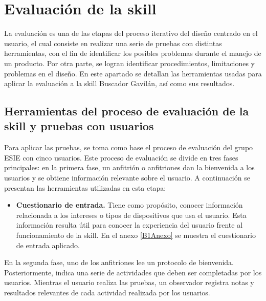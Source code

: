 
\section{Evaluación de la skill}
\label{EvaluacionSkillcapIV}

La evaluación es una de las etapas del proceso iterativo del diseño centrado en el usuario, el cual consiste en realizar una serie de pruebas con distintas herramientas, con el fin de identificar los posibles problemas durante el manejo de un producto. Por otra parte, se logran identificar procedimientos, limitaciones y problemas en el diseño. En este apartado se detallan las herramientas usadas para aplicar la evaluación a la skill Buscador Gavilán, así como sus resultados.


\subsection{Herramientas del proceso de evaluación de la skill y pruebas con usuarios}
\label{HerramientasEvaluacionPruebasUsuarioscapIV}

Para aplicar las pruebas, se toma como base el proceso de evaluación del grupo ESIE con cinco usuarios. Este proceso de evaluación se divide en tres fases principales: en la primera fase, un anfitrión o anfitriones dan la bienvenida a los usuarios y se obtiene información relevante sobre el usuario. A continuación se presentan las herramientas utilizadas en esta etapa:

\begin{itemize}
  \item \textbf{Cuestionario de entrada.} Tiene como propósito, conocer información relacionada a los intereses o tipos de dispositivos que usa el usuario. Esta información resulta útil para conocer la experiencia del usuario frente al funcionamiento de la skill. En el anexo \ref{B1Anexo} se muestra el cuestionario de entrada aplicado.
\end{itemize}

En la segunda fase, uno de los anfitriones lee un protocolo de bienvenida. Posteriormente, indica una serie de actividades que deben ser completadas por los usuarios. Mientras el usuario realiza las pruebas, un observador registra notas y resultados relevantes de cada actividad realizada por los usuarios.

